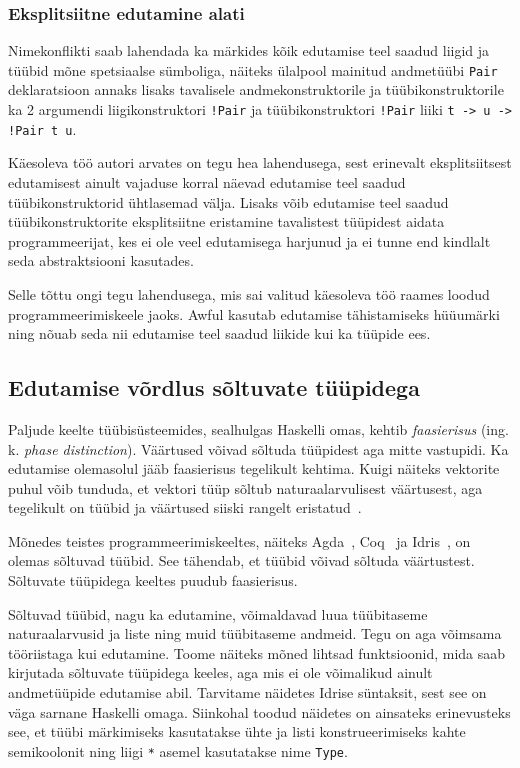 \documentclass[12pt]{article}
\begin{document}
      \subsubsection{Eksplitsiitne edutamine alati}
        Nimekonflikti saab lahendada ka märkides kõik edutamise teel saadud liigid ja tüübid mõne spetsiaalse sümboliga, näiteks ülalpool mainitud andmetüübi \verb!Pair! deklaratsioon annaks lisaks tavalisele andmekonstruktorile ja tüübikonstruktorile ka 2 argumendi liigikonstruktori \verb"!Pair" ja tüübikonstruktori \verb"!Pair" liiki \verb"t -> u -> !Pair t u".

        Käesoleva töö autori arvates on tegu hea lahendusega, sest erinevalt eksplitsiitsest edutamisest ainult vajaduse korral näevad edutamise teel saadud tüübikonstruktorid ühtlasemad välja. Lisaks võib edutamise teel saadud tüübikonstruktorite eksplitsiitne eristamine tavalistest tüüpidest aidata programmeerijat, kes ei ole veel edutamisega harjunud ja ei tunne end kindlalt seda abstraktsiooni kasutades.

        Selle tõttu ongi tegu lahendusega, mis sai valitud käesoleva töö raames loodud programmeerimiskeele jaoks. Awful kasutab edutamise tähistamiseks hüüumärki ning nõuab seda nii edutamise teel saadud liikide kui ka tüüpide ees.
    \subsection{Edutamise võrdlus sõltuvate tüüpidega}\label{soltuvad}
      Paljude keelte tüübisüsteemides, sealhulgas Haskelli omas, kehtib \textit{faasierisus} (ing. k. \textit{phase distinction}). Väärtused võivad sõltuda tüüpidest aga mitte vastupidi. Ka edutamise olemasolul jääb faasierisus tegelikult kehtima. Kuigi näiteks vektorite puhul võib tunduda, et vektori tüüp sõltub naturaalarvulisest väärtusest, aga tegelikult on tüübid ja väärtused siiski rangelt eristatud~\cite{Giv}.

      Mõnedes teistes programmeerimiskeeltes, näiteks Agda~\cite{Agd}, Coq~\cite{The_Coq} ja Idris~\cite{The_Idr}, on olemas sõltuvad tüübid. See tähendab, et tüübid võivad sõltuda väärtustest. Sõltuvate tüüpidega keeltes puudub faasierisus.

      Sõltuvad tüübid, nagu ka edutamine, võimaldavad luua tüübitaseme naturaalarvusid ja liste ning muid tüübitaseme andmeid. Tegu on aga võimsama tööriistaga kui edutamine. Toome näiteks mõned lihtsad funktsioonid, mida saab kirjutada sõltuvate tüüpidega keeles, aga mis ei ole võimalikud ainult andmetüüpide edutamise abil. Tarvitame näidetes Idrise süntaksit, sest see on väga sarnane Haskelli omaga. Siinkohal toodud näidetes on ainsateks erinevusteks see, et tüübi märkimiseks kasutatakse ühte ja listi konstrueerimiseks kahte semikoolonit ning liigi \verb!*! asemel kasutatakse nime \verb!Type!.
\end{document}
